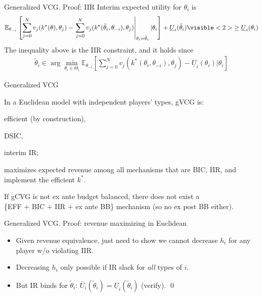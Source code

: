 \documentclass[english,10pt
,aspectratio=169
,handout
]{beamer}
\begin{document}
\begin{frame}{Generalized VCG. Proof: IIR}
	Interim expected utility for $\theta_i$ is
	\begin{align*}
		\mathbb{E}_{\theta_{-i}} \left[ \sum_{j =0}^N v_j (k^*(\theta),\theta_j) - \left. \sum_{j =0}^N v_j (k^*(\tilde{\theta}_i,\theta_{-i}),\theta_j) \right|_{\theta_i = \tilde{\theta}_i} | \theta_i \right] + \underline{U}_i (\tilde{\theta}_i)
		\visible<2>{
			\geq \underline{U}_i(\theta_i)
		}
	\end{align*}
	\pause
	The inequality above is the IIR constraint, and it holds since
	\begin{align*}
	\tilde{\theta}_i \in \arg \min_{\theta_i \in \Theta_i} \mathbb{E}_{\theta_{-i}} \left[ \sum_{j=0}^{N} v_j (k^*(\theta_i,\theta_{-i}),\theta_j) - \underline{U}_i (\theta_i) | \theta_i \right]
	\end{align*}
\end{frame}


\begin{frame}{Generalized VCG}
	\begin{theorem}
		In a \alert{Euclidean} model with independent players' types, gVCG is:
		\begin{itemize}{\color{gray}
				\item efficient (by construction),
				\item DSIC,
				\item interim IR;}
			\item maximizes expected revenue among all mechanisms that are BIC, IIR, and implement the efficient $k^*$.
		\end{itemize}
	\end{theorem}
	If gCVG is not ex ante budget balanced, there does not exist a \\
	\{EFF + BIC + IIR + ex ante BB\} mechanism (so no ex post BB either).
\end{frame}


\begin{frame}{Generalized VCG. Proof: revenue maximizing in Euclidean}
\begin{itemize}
	\item Given revenue equivalence, just need to show we cannot decrease $h_i$ for any player w/o violating IIR.
	\pause
	\item Decreasing $h_i$ only possible if IR slack for \emph{all} types of $i$.
	\pause
	\item But IR binds for $\tilde{\theta}_i$: $\bar{U}_i (\tilde{\theta}_i) = \underline{U}_i (\tilde{\theta}_i)$ (verify). \qed
\end{itemize}
\end{frame}
\end{document}
